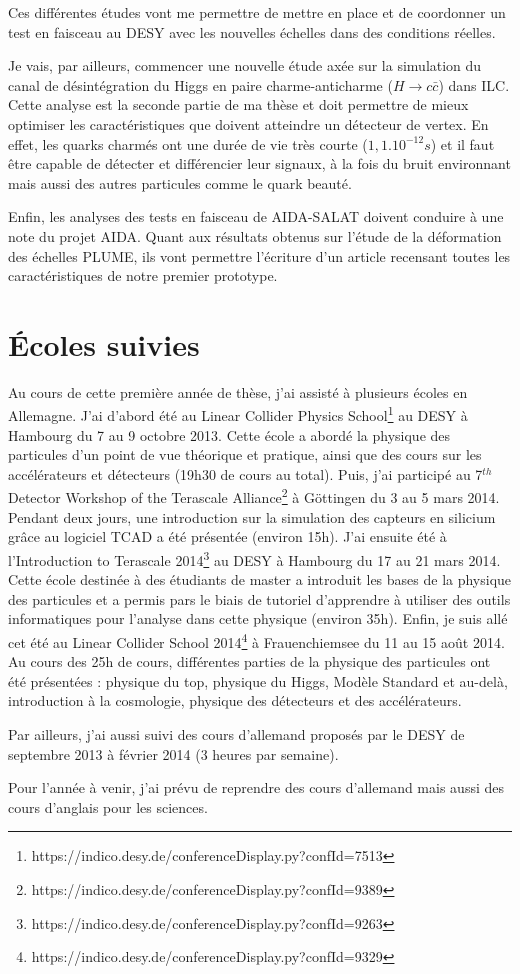 \documentclass[a4papper, 10pt]{article}
\begin{document}
        Ces différentes études vont me permettre de mettre en place et de coordonner un test en faisceau au DESY avec les nouvelles échelles dans des conditions réelles.

        Je vais, par ailleurs, commencer une nouvelle étude axée sur la simulation du canal de désintégration du Higgs en paire charme-anticharme ($H \rightarrow c \bar{c}$) dans ILC. Cette analyse est la seconde partie de ma thèse et doit permettre de mieux optimiser les caractéristiques que doivent atteindre un détecteur de vertex. En effet, les quarks charmés ont une durée de vie très courte ($1,1.10^{-12}s$) et il faut être capable de détecter et différencier leur signaux, à la fois du bruit environnant mais aussi des autres particules comme le quark beauté.

        Enfin, les analyses des tests en faisceau de AIDA-SALAT doivent conduire à une note du projet AIDA. Quant aux résultats obtenus sur l'étude de la déformation des échelles PLUME, ils vont permettre l'écriture d'un article recensant toutes les caractéristiques de notre premier prototype.
        
    \section{Écoles suivies}

    Au cours de cette première année de thèse, j'ai assisté à plusieurs écoles en Allemagne. J'ai d'abord été au Linear Collider Physics School\footnote{https://indico.desy.de/conferenceDisplay.py?confId=7513} au DESY à Hambourg du 7 au 9 octobre 2013. Cette école a abordé la physique des particules d'un point de vue théorique et pratique, ainsi que des cours sur les accélérateurs et détecteurs (19h30 de cours au total). 
        Puis, j'ai participé au 7$^{th}$ Detector Workshop of the Terascale Alliance\footnote{https://indico.desy.de/conferenceDisplay.py?confId=9389} à Göttingen du 3 au 5 mars 2014. Pendant deux jours, une introduction sur la simulation des capteurs en silicium grâce au logiciel TCAD a été présentée (environ 15h).
        J'ai ensuite été à l'Introduction to Terascale 2014\footnote{https://indico.desy.de/conferenceDisplay.py?confId=9263} au DESY à Hambourg du 17 au 21 mars 2014. Cette école destinée à des étudiants de master a introduit les bases de la physique des particules et a permis pars le biais de tutoriel d'apprendre à utiliser des outils informatiques pour l'analyse dans cette physique (environ 35h).
        Enfin, je suis allé cet été au Linear Collider School 2014\footnote{https://indico.desy.de/conferenceDisplay.py?confId=9329} à Frauenchiemsee du 11 au 15 août 2014. Au cours des 25h de cours, différentes parties de la physique des particules ont été présentées : physique du top, physique du Higgs, Modèle Standard et au-delà, introduction à la cosmologie, physique des détecteurs et des accélérateurs. 

        Par ailleurs, j'ai aussi suivi des cours d'allemand proposés par le DESY de septembre 2013 à février 2014 (3 heures par semaine).

        Pour l'année à venir, j'ai prévu de reprendre des cours d'allemand mais aussi des cours d'anglais pour les sciences.
 
\end{document}
